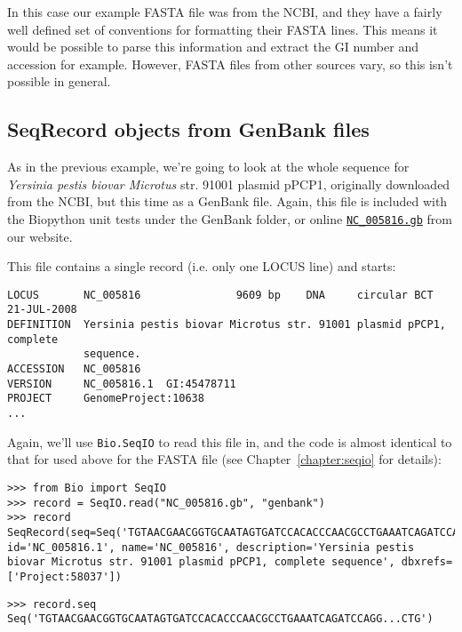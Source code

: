 In this case our example FASTA file was from the NCBI, and they have a fairly well defined set of conventions for formatting their FASTA lines. This means it would be possible to parse this information and extract the GI number and accession for example. However, FASTA files from other sources vary, so this isn't possible in general.

\subsection{SeqRecord objects from GenBank files}

As in the previous example, we're going to look at the whole sequence for \textit{Yersinia pestis biovar Microtus} str. 91001 plasmid pPCP1, originally downloaded from the NCBI, but this time as a GenBank file.
Again, this file is included with the Biopython unit tests under the GenBank folder, or online \href{https://raw.githubusercontent.com/biopython/biopython/master/Tests/GenBank/NC_005816.gb}{\texttt{NC\_005816.gb}} from our website.

This file contains a single record (i.e. only one LOCUS line) and starts:

\begin{verbatim}
LOCUS       NC_005816               9609 bp    DNA     circular BCT 21-JUL-2008
DEFINITION  Yersinia pestis biovar Microtus str. 91001 plasmid pPCP1, complete
            sequence.
ACCESSION   NC_005816
VERSION     NC_005816.1  GI:45478711
PROJECT     GenomeProject:10638
...
\end{verbatim}

Again, we'll use \verb|Bio.SeqIO| to read this file in, and the code is almost identical to that for used above for the FASTA file (see Chapter~\ref{chapter:seqio} for details):

\begin{verbatim}
>>> from Bio import SeqIO
>>> record = SeqIO.read("NC_005816.gb", "genbank")
>>> record
SeqRecord(seq=Seq('TGTAACGAACGGTGCAATAGTGATCCACACCCAACGCCTGAAATCAGATCCAGG...CTG'), id='NC_005816.1', name='NC_005816', description='Yersinia pestis biovar Microtus str. 91001 plasmid pPCP1, complete sequence', dbxrefs=['Project:58037'])
\end{verbatim}

\begin{verbatim}
>>> record.seq
Seq('TGTAACGAACGGTGCAATAGTGATCCACACCCAACGCCTGAAATCAGATCCAGG...CTG')
\end{verbatim}

